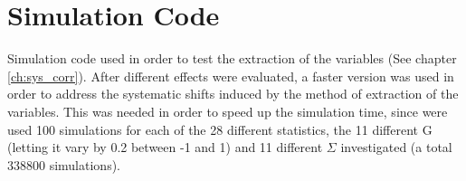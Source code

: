 \begin{figure}[htb]
\ContinuedFloat
  \begin{center} 
  \end{center}
\end{figure}

\FloatBarrier
\section{Simulation Code}
\label{app:simcode}
Simulation code used in order to test the extraction of the variables (See chapter \ref{ch:sys_corr}). After different effects were evaluated, a faster version was used in order to address the systematic shifts induced by the method of extraction of the variables. This was needed in order to speed up the simulation time, since were used 100 simulations for each of the 28 different statistics, the 11 different G (letting it vary by 0.2 between -1 and 1) and 11 different $\Sigma$ investigated (a total 338800 simulations).
